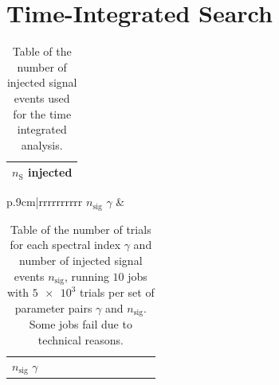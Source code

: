 %      

\section{Time-Integrated Search}

\begin{table}
  \centering
  \caption{Table of the number of injected signal events used for the time integrated analysis.}
  \label{tab:sig_time_int_table}
  \begin{tabular}{r}
    \toprule
    $n_\text{S}$ injected \\
    \toprule
      
    \toprule
  \end{tabular}
\end{table}

\begin{table}
  \caption{Table of the number of trials for each spectral index $\gamma$ and number of injected signal events $n_\text{sig}$, running $\num{10}$ jobs with $\num{5e3}$ trials per set of parameter pairs $\gamma$ and $n_\text{sig}$. Some jobs fail due to technical reasons.}
  \label{tab:trials_sig_time_int_table}
  \begin{subtable}{\linewidth}
  \centering
  \begin{tabular}{p{.9cm}|rrrrrrrrrr}
    \toprule
    \: $n_\text{sig}$ \newline $\gamma$ \: & 
    \toprule
    
    \toprule
  \end{tabular}
\end{subtable}
\begin{subtable}{\linewidth}
\centering
  \begin{tabular}{p{.9cm}|rrrrrrrrrr}
    \toprule
    \: $n_\text{sig}$ \newline $\gamma$ \: & 
    \toprule
    
    \toprule
  \end{tabular}
  \end{subtable}
\end{table}

